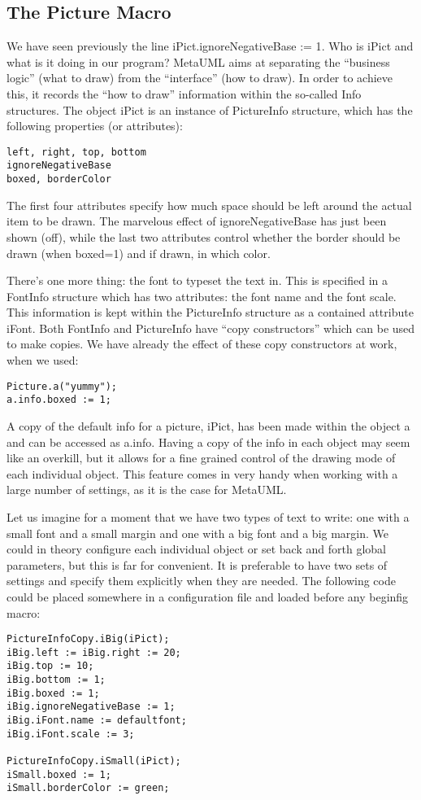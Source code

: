\documentclass{article}
\newcommand{\code}{\ttfamily}
\begin{document}
\subsection{The Picture Macro}

We have seen previously the line {\code iPict.ignoreNegativeBase := 1}.
Who is {\code iPict} and what is it doing in our program? MetaUML
aims at separating the ``business logic'' (what to draw) from the
``interface'' (how to draw). In order to achieve this, it records the ``how to draw''
information within the so-called {\code Info} structures. The object {\code iPict}
is an instance of {\code PictureInfo} structure, which has the following properties
(or attributes):
\begin{verbatim}
left, right, top, bottom
ignoreNegativeBase
boxed, borderColor
\end{verbatim}

The first four attributes specify how much space should be left around the
actual item to be drawn. The marvelous effect of {\code ignoreNegativeBase}
has just been shown (off), while the last two attributes control whether the border
should be drawn (when {\code boxed=1}) and if drawn, in which color.

There's one more thing: the font to typeset the text in. This is specified
in a {\code FontInfo} structure which has two attributes: the font name
and the font scale. This information is kept within the {\code PictureInfo} structure
as a contained attribute {\code iFont}. Both {\code FontInfo} and {\code PictureInfo}
have ``copy constructors'' which can be used to make copies. We have already
the effect of these copy constructors at work, when we used:

\begin{verbatim}
Picture.a("yummy");
a.info.boxed := 1;
\end{verbatim}

A copy of the default info for a picture, {\code iPict}, has been made within
the object {\code a} and can be accessed as {\code a.info}. Having a copy of the
info in each object may seem like an overkill, but it allows for a fine grained
control of the drawing mode of each individual object. This feature comes in very
handy when working with a large number of settings, as it is the case for MetaUML.

Let us imagine for a moment that we have two types of text to write: one with a small font
and a small margin and one with a big font and a big margin. We could in theory
configure each individual object or set back and forth global parameters, but
this is far for convenient. It is preferable to have two sets of settings and specify
them explicitly when they are needed. The following code could be placed somewhere
in a configuration file and loaded before any {\code beginfig} macro:
\begin{verbatim}
PictureInfoCopy.iBig(iPict);
iBig.left := iBig.right := 20;
iBig.top := 10;
iBig.bottom := 1;
iBig.boxed := 1;
iBig.ignoreNegativeBase := 1;
iBig.iFont.name := defaultfont;
iBig.iFont.scale := 3;

PictureInfoCopy.iSmall(iPict);
iSmall.boxed := 1;
iSmall.borderColor := green;
\end{verbatim}
\end{document}
